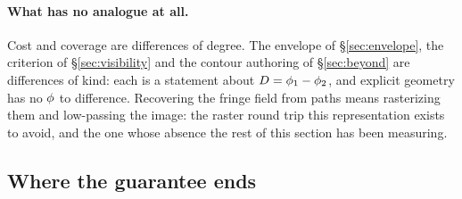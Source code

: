 \paragraph{What has no analogue at all.}
Cost and coverage are differences of degree. The envelope of \S\ref{sec:envelope},
the criterion of \S\ref{sec:visibility} and the contour authoring of
\S\ref{sec:beyond} are differences of kind: each is a statement about
$D = \phi_1 - \phi_2$, and explicit geometry has no $\phi$ to difference. Recovering
the fringe field from paths means rasterizing them and low-passing the
image: the raster round trip this representation exists to avoid, and the one
whose absence the rest of this section has been measuring.

\subsection{Where the guarantee ends}
\label{sec:limits}


